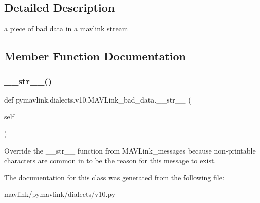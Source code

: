 \subsection{Detailed Description}
\begin{DoxyVerb}a piece of bad data in a mavlink stream
\end{DoxyVerb}
 

\subsection{Member Function Documentation}
\mbox{\label{classpymavlink_1_1dialects_1_1v10_1_1MAVLink__bad__data_adb767168c11d9ddb770cb100674fbed4}} 
\subsubsection{\texorpdfstring{\+\_\+\+\_\+str\+\_\+\+\_\+()}{\_\_str\_\_()}}
{\footnotesize\ttfamily def pymavlink.\+dialects.\+v10.\+M\+A\+V\+Link\+\_\+bad\+\_\+data.\+\_\+\+\_\+str\+\_\+\+\_\+ (\begin{DoxyParamCaption}\item[{}]{self }\end{DoxyParamCaption})}

\begin{DoxyVerb}Override the __str__ function from MAVLink_messages because non-printable characters are common in to be the reason for this message to exist.\end{DoxyVerb}
 

The documentation for this class was generated from the following file\+:\begin{DoxyCompactItemize}
\item 
mavlink/pymavlink/dialects/v10.\+py\end{DoxyCompactItemize}
